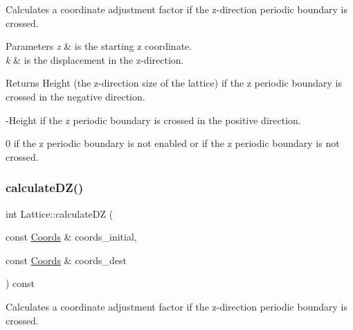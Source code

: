 Calculates a coordinate adjustment factor if the z-\/direction periodic boundary is crossed. 


\begin{DoxyParams}{Parameters}
{\em z} & is the starting z coordinate. \\
\hline
{\em k} & is the displacement in the z-\/direction. \\
\hline
\end{DoxyParams}
\begin{DoxyReturn}{Returns}
Height (the z-\/direction size of the lattice) if the z periodic boundary is crossed in the negative direction. 

-\/\+Height if the z periodic boundary is crossed in the positive direction. 

0 if the z periodic boundary is not enabled or if the z periodic boundary is not crossed. 
\end{DoxyReturn}
\mbox{\label{class_lattice_a76b38079e102e17c79b13a3398a404a0}} 
\subsubsection{\texorpdfstring{calculate\+D\+Z()}{calculateDZ()}\hspace{0.1cm}{\footnotesize\ttfamily [2/2]}}
{\footnotesize\ttfamily int Lattice\+::calculate\+DZ (\begin{DoxyParamCaption}\item[{const \hyperlink{struct_coords}{Coords} \&}]{coords\+\_\+initial,  }\item[{const \hyperlink{struct_coords}{Coords} \&}]{coords\+\_\+dest }\end{DoxyParamCaption}) const}



Calculates a coordinate adjustment factor if the z-\/direction periodic boundary is crossed. 


